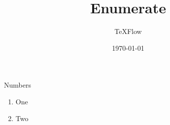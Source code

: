 \documentclass[aspectratio=43]{beamer}
\title{Enumerate}
\author{TeXFlow}
\date{\today}
\begin{document}
\begin{frame}{Numbers}
\begin{enumerate}
  \item One
  \item Two
\end{enumerate}
\end{frame}
\end{document}
